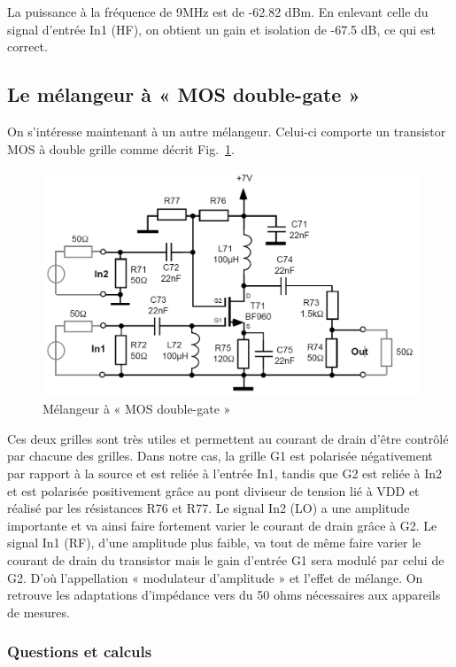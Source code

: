 \documentclass{article}
\begin{document}
La puissance à la fréquence de 9MHz est de -62.82 dBm. En enlevant celle du signal d'entrée In1 (HF), on obtient un gain et isolation de -67.5 dB, ce qui est correct.


\subsection{Le mélangeur à « MOS double-gate »}

On s'intéresse maintenant à un autre mélangeur. Celui-ci comporte un transistor MOS à double grille comme décrit Fig.~\ref{fig:schema_melangeur_mosdoublegate}.
\begin{figure}[h!]
	\centering
	\includegraphics[width=.7\textwidth]{schema_melangeur_mosdoublegate}
	\caption{Mélangeur à « MOS double-gate »}
	\label{fig:schema_melangeur_mosdoublegate}
\end{figure}

Ces deux grilles sont très utiles et permettent au courant de drain d'être contrôlé par chacune des grilles. Dans notre cas, la grille G1 est polarisée négativement par rapport à la source et est reliée à l'entrée In1, tandis que G2 est reliée à In2 et est polarisée positivement grâce au pont diviseur de tension lié à VDD et réalisé par les résistances R76 et R77.
Le signal In2 (LO) a une amplitude importante et va ainsi faire fortement varier le courant de drain grâce à G2. Le signal In1 (RF), d'une amplitude plus faible, va tout de même faire varier le courant de drain du transistor mais le gain d'entrée G1 sera modulé par celui de G2. D'où l'appellation « modulateur d'amplitude » et l'effet de mélange.
On retrouve les adaptations d'impédance vers du 50 ohms nécessaires aux appareils de mesures.


\subsubsection{Questions et calculs}

\end{document}
